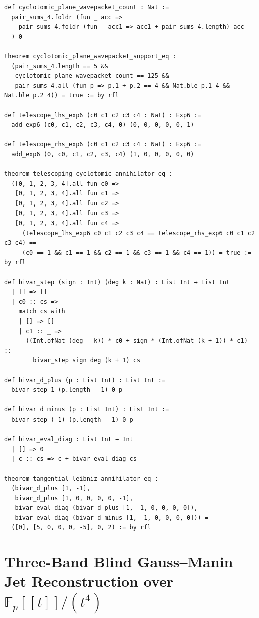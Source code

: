 \documentclass[11pt,a4paper]{article}
\begin{document}
\begin{lstlisting}[caption={Cyclotomic wavepacket support, telescoping annihilator, and tangential Leibniz operators.}]
def cyclotomic_plane_wavepacket_count : Nat :=
  pair_sums_4.foldr (fun _ acc =>
    pair_sums_4.foldr (fun _ acc1 => acc1 + pair_sums_4.length) acc
  ) 0

theorem cyclotomic_plane_wavepacket_support_eq :
  (pair_sums_4.length == 5 &&
   cyclotomic_plane_wavepacket_count == 125 &&
   pair_sums_4.all (fun p => p.1 + p.2 == 4 && Nat.ble p.1 4 && Nat.ble p.2 4)) = true := by rfl

def telescope_lhs_exp6 (c0 c1 c2 c3 c4 : Nat) : Exp6 :=
  add_exp6 (c0, c1, c2, c3, c4, 0) (0, 0, 0, 0, 0, 1)

def telescope_rhs_exp6 (c0 c1 c2 c3 c4 : Nat) : Exp6 :=
  add_exp6 (0, c0, c1, c2, c3, c4) (1, 0, 0, 0, 0, 0)

theorem telescoping_cyclotomic_annihilator_eq :
  ([0, 1, 2, 3, 4].all fun c0 =>
   [0, 1, 2, 3, 4].all fun c1 =>
   [0, 1, 2, 3, 4].all fun c2 =>
   [0, 1, 2, 3, 4].all fun c3 =>
   [0, 1, 2, 3, 4].all fun c4 =>
     (telescope_lhs_exp6 c0 c1 c2 c3 c4 == telescope_rhs_exp6 c0 c1 c2 c3 c4) ==
     (c0 == 1 && c1 == 1 && c2 == 1 && c3 == 1 && c4 == 1)) = true := by rfl

def bivar_step (sign : Int) (deg k : Nat) : List Int → List Int
  | [] => []
  | c0 :: cs =>
    match cs with
    | [] => []
    | c1 :: _ =>
      ((Int.ofNat (deg - k)) * c0 + sign * (Int.ofNat (k + 1)) * c1) ::
        bivar_step sign deg (k + 1) cs

def bivar_d_plus (p : List Int) : List Int :=
  bivar_step 1 (p.length - 1) 0 p

def bivar_d_minus (p : List Int) : List Int :=
  bivar_step (-1) (p.length - 1) 0 p

def bivar_eval_diag : List Int → Int
  | [] => 0
  | c :: cs => c + bivar_eval_diag cs

theorem tangential_leibniz_annihilator_eq :
  (bivar_d_plus [1, -1],
   bivar_d_plus [1, 0, 0, 0, 0, -1],
   bivar_eval_diag (bivar_d_plus [1, -1, 0, 0, 0, 0]),
   bivar_eval_diag (bivar_d_minus [1, -1, 0, 0, 0, 0])) =
  ([0], [5, 0, 0, 0, -5], 0, 2) := by rfl
\end{lstlisting}

\section{Three-Band Blind Gauss--Manin Jet Reconstruction over \texorpdfstring{$\mathbb{F}_p[[t]]/(t^4)$}{Fp[[t]]/(t4)}}
\end{document}
